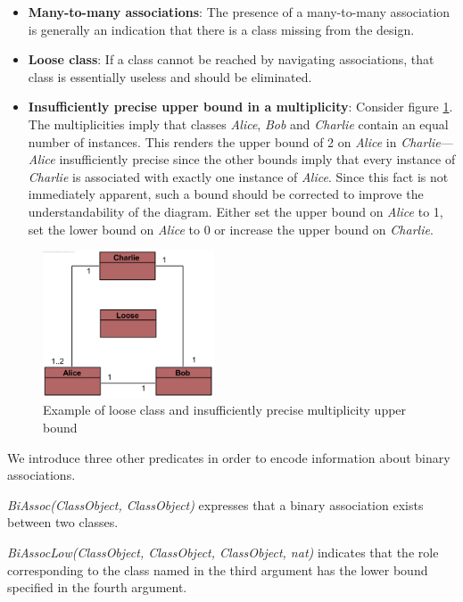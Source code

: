 \documentclass[conference]{IEEEtran}
\begin{document}
\begin{itemize}
	\item \textbf{Many-to-many associations}: The presence of a many-to-many association is generally an indication that there is a class missing from the design.
	\item \textbf{Loose class}: If a class cannot be reached by navigating associations, that class is essentially useless and should be eliminated.
	\item \textbf{Insufficiently precise upper bound in a multiplicity}\cite{Balaban2015}: Consider figure \ref{fig:design-flaw}. The multiplicities imply that classes \textit{Alice}, \textit{Bob} and \textit{Charlie} contain an equal number of instances. This renders the upper bound of 2 on \textit{Alice} in \textit{Charlie}---\textit{Alice} insufficiently precise since the other bounds imply that every instance of \textit{Charlie} is associated with exactly one instance of \textit{Alice}. Since this fact is not immediately apparent, such a bound should be corrected to improve the understandability of the diagram. Either set the upper bound on \textit{Alice} to 1, set the lower bound on \textit{Alice} to 0 or increase the upper bound on \textit{Charlie}.
\end{itemize}

\begin{figure}[!t]
	\centering
	\includegraphics[width=2in]{cycle}
	\caption{Example of loose class and insufficiently precise multiplicity upper bound}
	\label{fig:design-flaw}
\end{figure}

We introduce three other predicates in order to encode information about binary associations.

\textit{BiAssoc(ClassObject, ClassObject)} expresses that a binary association exists between two classes.

\textit{BiAssocLow(ClassObject, ClassObject, ClassObject, nat)} indicates that the role corresponding to the class named in the third argument has the lower bound specified in the fourth argument.
\end{document}
